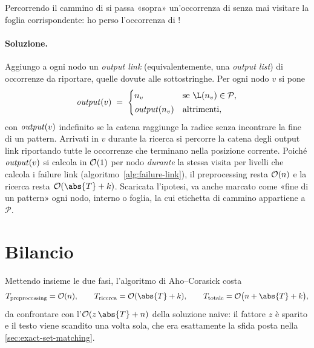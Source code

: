 Percorrendo il cammino di  si passa «sopra» un'occorrenza di  senza mai
visitare la foglia corrispondente: ho perso l'occorrenza di !

\paragraph{Soluzione.}
Aggiungo a ogni nodo un \emph{output link} (equivalentemente, una \emph{output list}) di
occorrenze da riportare, quelle dovute alle sottostringhe. Per ogni nodo $v$ si pone
\[
  \out(v) \;=\;
  \begin{cases}
    \nv{v} & \text{se } \L(\nv{v}) \in \mathcal{P},\\[2pt]
    \out(\nv{v}) & \text{altrimenti,}
  \end{cases}
\]
con $\mathit{output}(v)$ indefinito se la catena raggiunge la radice senza incontrare la fine di un
pattern. Arrivati in $v$ durante la ricerca si percorre la catena degli output link
riportando tutte le occorrenze che terminano nella posizione corrente. Poiché $\mathit{output}(v)$ si
calcola in $\mathcal{O}(1)$ per nodo \emph{durante} la stessa visita per livelli che calcola i
failure link (algoritmo~\ref{alg:failure-link}), il preprocessing resta $\mathcal{O}(n)$ e la ricerca
resta $\Oh(\abs{T} + k)$. Scaricata l'ipotesi, va anche marcato come «fine di un pattern»
ogni nodo, interno o foglia, la cui etichetta di cammino appartiene a $\mathcal{P}$.

\section{Bilancio}

Mettendo insieme le due fasi, l'algoritmo di Aho--Corasick costa
\[
  T_{\text{preprocessing}} = \Oh(n),
  \qquad
  T_{\text{ricerca}} = \Oh(\abs{T} + k),
  \qquad
  T_{\text{totale}} = \Oh\bigl(n + \abs{T} + k\bigr),
\]
da confrontare con l'$\Oh(z\,\abs{T} + n)$ della soluzione naive: il fattore $z$ è sparito e
il testo viene scandito una volta sola, che era esattamente la sfida posta nella
\autoref{sec:exact-set-matching}.
